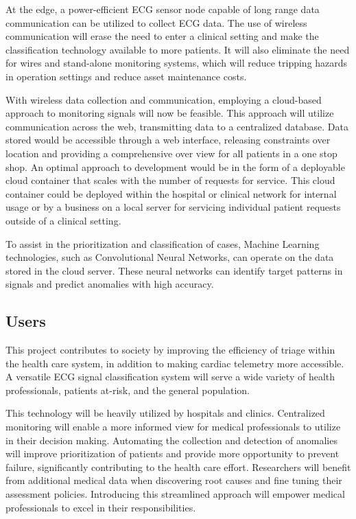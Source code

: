 \documentclass{article}
\begin{document}
At the edge, a power-efficient ECG sensor node capable of long range data communication can be utilized to collect ECG data. The use of wireless communication will erase the need to enter a clinical setting and make the classification technology available to more patients. It will also eliminate the need for wires and stand-alone monitoring systems, which will reduce tripping hazards in operation settings and reduce asset maintenance costs. 

With wireless data collection and communication, employing a cloud-based approach to monitoring signals will now be feasible. This approach will utilize communication across the web, transmitting data to a centralized database. Data stored would be accessible through a web interface, releasing constraints over location  and providing a comprehensive over view for all patients in a one stop shop. An optimal approach to development would be in the form of a deployable cloud container that scales with the number of requests for service. This cloud container could be deployed within the hospital or clinical network for internal usage or by a business on a local server for servicing individual patient requests outside of a clinical setting.

To assist in the prioritization and classification of cases, Machine Learning technologies, such as Convolutional Neural Networks, can operate on the data stored in the cloud server. These neural networks can identify target patterns in signals and predict anomalies with high accuracy. 

\subsection{Users}
This project contributes to society by improving the efficiency of triage within the health care system, in addition to making cardiac telemetry more accessible. A versatile ECG signal classification system will serve a wide variety of health professionals, patients at-risk, and the general population.

This technology will be heavily utilized by hospitals and clinics. Centralized monitoring will enable a more informed view for medical professionals to utilize in their decision making. Automating the collection and detection of anomalies will improve prioritization of patients and provide more opportunity to prevent failure, significantly contributing to the health care effort. Researchers will benefit from additional medical data when discovering root causes and fine tuning their assessment policies. Introducing this streamlined approach will empower medical professionals to excel in their responsibilities.
\end{document}
